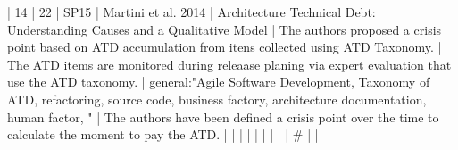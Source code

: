 | 14 |         22 | SP15 | Martini et al. 2014                                                  | Architecture Technical Debt: Understanding Causes and a Qualitative Model                                                                                                | The authors proposed a crisis point based on ATD accumulation from itens collected using ATD Taxonomy.                                                                                                                                                   | The ATD items are monitored during releaase planing via expert evaluation that use the ATD taxonomy.                                                                                                                                                               | general:"Agile Software Development, Taxonomy of ATD, refactoring, source code, business factory, architecture documentation, human factor,  "                                                                                                                                                           | The authors have been defined a crisis point over the time to calculate the moment to pay the ATD.                                                                                                                                                                                                                                                                                                                                                                                       |
|    |            |      |                                                                      |                                                                                                                                                                          |                                                                                                                                                                                                                                                            |                                                                                                                                                                                                                                                                      |  #                                                                                                                                                                                                                                                                                                       |                                                                                                                                                                                                                                                                                                                                                                                                                                                                                              |
